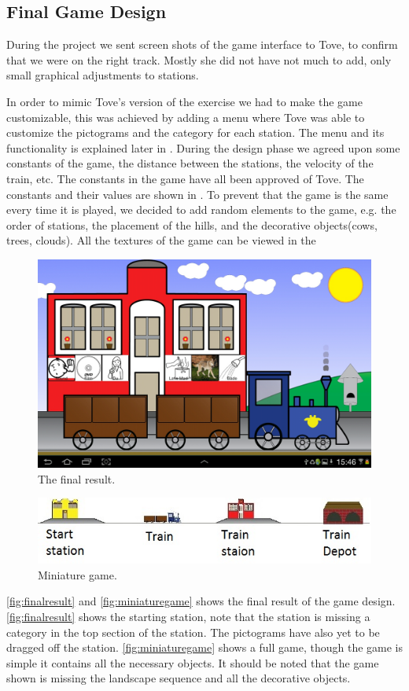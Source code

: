 \subsection{Final Game Design}\label{sec:designgameinterface}

During the project we sent screen shots of the game interface to Tove, to confirm that we were on the right track. Mostly she did not have not much to add, only small graphical adjustments to stations.

In order to mimic Tove's version of the exercise we had to make the game customizable, this was achieved by adding a menu where Tove was able to customize the pictograms and the category for each station. The menu and its functionality is explained later in .
During the design phase we agreed upon some constants of the game, the distance between the stations, the velocity of the train, etc. The constants in the game have all been approved of Tove. The constants and their values are shown in .
To prevent that the game is the same every time it is played, we decided to add random elements to the game, e.g. the order of stations, the placement of the hills, and the decorative objects(cows, trees, clouds). 
All the textures of the game can be viewed in the 
\begin{figure}[H]
\centering
\includegraphics[width=0.9\linewidth]{img/screenshots/gamedesign1.jpg}
\caption{The final result.}
\label{fig:finalresult}
\end{figure}
\begin{figure}[H]
\centering
\includegraphics[width=0.9\linewidth]{img/screenshots/stations.jpg}
\caption{Miniature game.}
\label{fig:miniaturegame}
\end{figure}
\autoref{fig:finalresult} and \autoref{fig:miniaturegame} shows the final result of the game design. \autoref{fig:finalresult} shows the starting station, note that the station is missing a category in the top section of the station. The pictograms have also yet to be dragged off the station.
\autoref{fig:miniaturegame} shows a full game, though the game is simple it contains all the necessary objects. It should be noted that the game shown is missing the landscape sequence and all the decorative objects.

